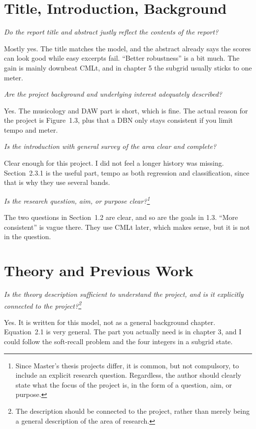 \documentclass[11pt,a4paper]{article}
\newcommand{\prompt}[1]{%
  \par\medskip
  \noindent\textit{#1}%
  \par\smallskip
}
\begin{document}
\section{Title, Introduction, Background}

\prompt{Do the report title and abstract justly reflect the contents of the report?}

Mostly yes. The title matches the model, and the abstract already says the scores can look good while easy excerpts fail. ``Better robustness'' is a bit much. The gain is mainly downbeat CMLt, and in chapter 5 the subgrid usually sticks to one meter.

\prompt{Are the project background and underlying interest adequately described?}

Yes. The musicology and DAW part is short, which is fine. The actual reason for the project is Figure~1.3, plus that a DBN only stays consistent if you limit tempo and meter.

\prompt{Is the introduction with general survey of the area clear and complete?}

Clear enough for this project. I did not feel a longer history was missing. Section~2.3.1 is the useful part, tempo as both regression and classification, since that is why they use several bands.

\prompt{Is the research question, aim, or purpose clear?\footnote{Since Master's thesis projects differ, it is common, but not compulsory, to include an explicit research question. Regardless, the author should clearly state what the focus of the project is, in the form of a question, aim, or purpose.}}

The two questions in Section~1.2 are clear, and so are the goals in 1.3. ``More consistent'' is vague there. They use CMLt later, which makes sense, but it is not in the question.

\section{Theory and Previous Work}

\prompt{Is the theory description sufficient to understand the project, and is it explicitly connected to the project?\footnote{The description should be connected to the project, rather than merely being a general description of the area of research.}}

Yes. It is written for this model, not as a general background chapter. Equation~2.1 is very general. The part you actually need is in chapter 3, and I could follow the soft-recall problem and the four integers in a subgrid state.
\end{document}
